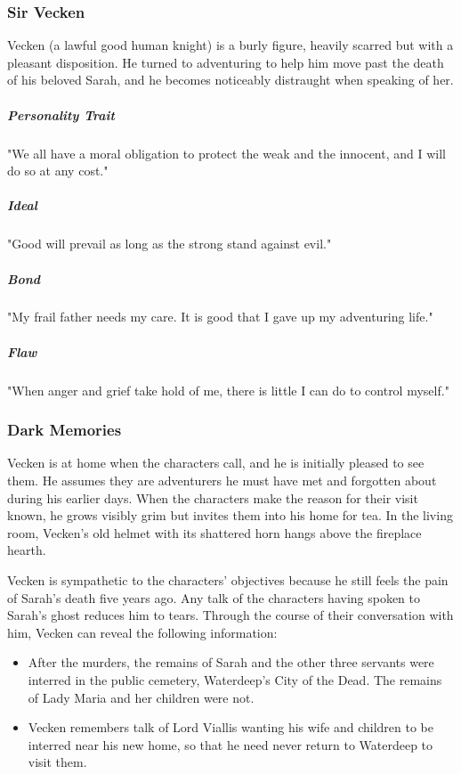 \documentclass[10pt,a4paper,twoside,bg=print,twocolumn,openany,nodeprecatedcode]{dndbook}
\begin{document}
\subsubsection{Sir Vecken}
Vecken (a lawful good human knight) is a burly figure, heavily scarred but with a pleasant disposition. He turned to adventuring to help him move past the death of his beloved Sarah, and he becomes noticeably distraught when speaking of her.

\subparagraph{Personality Trait}
"We all have a moral obligation to protect the weak and the innocent, and I will do so at any cost."

\subparagraph{Ideal}
"Good will prevail as long as the strong stand against evil."

\subparagraph{Bond}
"My frail father needs my care. It is good that I gave up my adventuring life."

\subparagraph{Flaw}
"When anger and grief take hold of me, there is little I can do to control myself."

\subsubsection{Dark Memories}
Vecken is at home when the characters call, and he is initially pleased to see them. He assumes they are adventurers he must have met and forgotten about during his earlier days. When the characters make the reason for their visit known, he grows visibly grim but invites them into his home for tea. In the living room, Vecken's old helmet with its shattered horn hangs above the fireplace hearth.

Vecken is sympathetic to the characters' objectives because he still feels the pain of Sarah's death five years ago. Any talk of the characters having spoken to Sarah's ghost reduces him to tears. Through the course of their conversation with him, Vecken can reveal the following information:


\begin{itemize}
\item After the murders, the remains of Sarah and the other three servants were interred in the public cemetery, Waterdeep's City of the Dead. The remains of Lady Maria and her children were not.
\item Vecken remembers talk of Lord Viallis wanting his wife and children to be interred near his new home, so that he need never return to Waterdeep to visit them.
\end{itemize}
\end{document}
